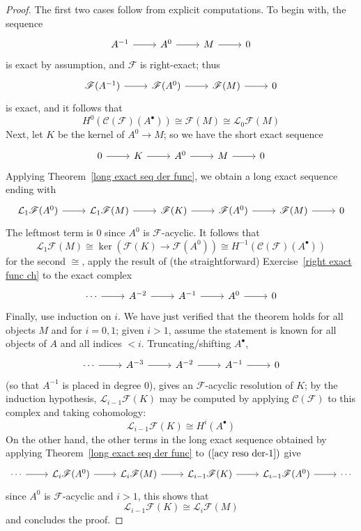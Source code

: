 \begin{proof}
The first two cases follow from explicit computations. To begin with, the
sequence
\[\begin{tikzcd}
A^{-1}\ar[r]&A^0\ar[r]&M\ar[r]&0
\end{tikzcd}\]
is exact by assumption, and $\mathscr{F}$ is right-exact; thus
\[\begin{tikzcd}
\mathscr{F}(A^{-1})\ar[r]&\mathscr{F}(A^0)\ar[r]&\mathscr{F}(M)\ar[r]&0
\end{tikzcd}\]
is exact, and it follows that
\[H^0(\mathcal{C}(\mathscr{F})(A^\bullet))\cong\mathscr{F}(M)\cong\mathcal{L}_0\mathscr{F}(M)\]
Next, let $K$ be the kernel of $A^0\to M$; so we have the short exact sequence
\begin{equation}\label{acy reso der-1}
\begin{tikzcd}
0\ar[r]&K\ar[r]&A^0\ar[r]&M\ar[r]&0
\end{tikzcd}
\end{equation}
Applying Theorem~\ref{long exact seq der func}, we obtain a long exact sequence ending with
\[\begin{tikzcd}
\mathcal{L}_1\mathscr{F}(A^0)\ar[r]&\mathcal{L}_1\mathscr{F}(M)\ar[r]&\mathscr{F}(K)\ar[r]&\mathscr{F}(A^0)\ar[r]&\mathscr{F}(M)\ar[r]&0
\end{tikzcd}\]
The leftmost term is $0$ since $A^0$ is $\mathscr{F}$-acyclic. It follows that
\[\mathcal{L}_1\mathscr{F}(M)\cong\ker(\mathscr{F}(K)\to\mathscr{F}(A^0))\cong H^{-1}(\mathcal{C}(\mathscr{F})(A^\bullet))\]
for the second $\cong$, apply the result of (the straightforward) Exercise~\ref{right exact func ch} to the exact complex
\[\begin{tikzcd}
\cdots\ar[r]&A^{-2}\ar[r]&A^{-1}\ar[r]&A^0\ar[r]&0
\end{tikzcd}\]
Finally, use induction on $i$. We have just verified that the theorem holds for all objects $M$ and for $i=0,1$; given $i>1$, assume the statement is known for all objects of $A$ and all indices $<i$. Truncating/shifting $A^\bullet$,
\[\begin{tikzcd}
\cdots\ar[r]&A^{-3}\ar[r]&A^{-2}\ar[r]&A^{-1}\ar[r]&0
\end{tikzcd}\]
(so that $A^{-1}$ is placed in degree $0$), gives an $\mathscr{F}$-acyclic resolution of $K$; by the induction hypothesis, $\mathcal{L}_{i-1}\mathscr{F}(K)$ may be computed by applying $\mathcal{C}(\mathscr{F})$ to this complex and taking cohomology:
\[\mathcal{L}_{i-1}\mathscr{F}(K)\cong H^i(A^\bullet)\]
On the other hand, the other terms in the long exact sequence obtained by applying Theorem~\ref{long exact seq der func} to $(\ref{acy reso der-1})$ give
\[\begin{tikzcd}
\cdots\ar[r]&\mathcal{L}_i\mathscr{F}(A^0)\ar[r]&\mathcal{L}_i\mathscr{F}(M)\ar[r]&\mathcal{L}_{i-1}\mathscr{F}(K)\ar[r]&\mathcal{L}_{i-1}\mathscr{F}(A^0)\ar[r]&\cdots
\end{tikzcd}\]
since $A^0$ is $\mathscr{F}$-acyclic and $i>1$, this shows that
\[\mathcal{L}_{i-1}\mathscr{F}(K)\cong\mathcal{L}_i\mathscr{F}(M)\]
and concludes the proof.
\end{proof}
